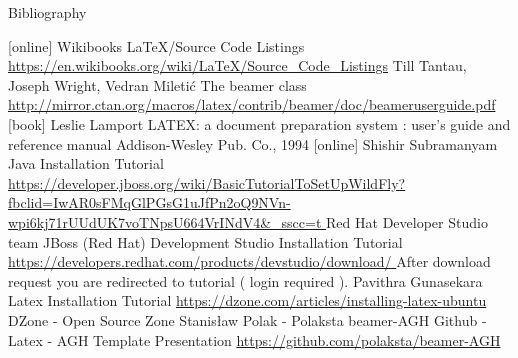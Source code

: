 \documentclass[aspectratio=1610,english]{beamer} %
\begin{document}
	\appendix
	\begin{frame}[allowframebreaks]{Bibliography}
  		\begin{thebibliography}{9}
    		[online]
      			{Wikibooks 
      				\newblock \LaTeX/Source Code Listings 
      				\newblock \url{https://en.wikibooks.org/wiki/LaTeX/Source_Code_Listings}
      			}
   				{Till Tantau, Joseph Wright, Vedran Miletić 
   					\newblock The beamer class 
   					\newblock \url{http://mirror.ctan.org/macros/latex/contrib/beamer/doc/beameruserguide.pdf}
   				}
      			{Leslie Lamport 
      				\newblock LATEX: a document preparation system : user's guide and reference manual 
      				\newblock Addison-Wesley Pub. Co., 1994 
      			}
      		[online]
      			{Shishir Subramanyam
      				\newblock Java Installation Tutorial
      				\newblock \url{ https://developer.jboss.org/wiki/BasicTutorialToSetUpWildFly?fbclid=IwAR0sFMqGlPGsG1uJfPn2oQ9NVn-wpi6kj71rUUdUK7voTNpsU664VrINdV4&_sscc=t } 
      			}
      			{Red Hat Developer Studio team
      				\newblock JBoss (Red Hat) Development Studio Installation Tutorial
      				\newblock \url{ https://developers.redhat.com/products/devstudio/download/ }
      				\newblock After download request you are redirected to tutorial ( login required ).
      			}
      			{Pavithra Gunasekara
      				\newblock Latex Installation Tutorial
      				\newblock \url{ https://dzone.com/articles/installing-latex-ubuntu }
      				\newblock DZone - Open Source Zone
      			}
      			{Stanisław Polak - Polaksta
      				\newblock beamer-AGH
      				\newblock Github - Latex - AGH Template Presentation
      				\newblock \url{https://github.com/polaksta/beamer-AGH}
      			}
  		\end{thebibliography}
	\end{frame}
\end{document}
